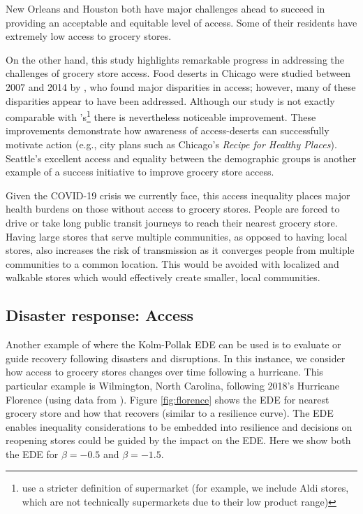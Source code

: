 \documentclass[final,3p,times,onecolumn,sort&compress]{elsarticle}
\begin{document}
New Orleans and Houston both have major challenges ahead to succeed in providing an acceptable and equitable level of access.
Some of their residents have extremely low access to grocery stores.

On the other hand, this study highlights remarkable progress in addressing the challenges of grocery store access.
Food deserts in Chicago were studied between 2007 and 2014 by \cite{Kolak2018-az}, who found major disparities in access; however, many of these disparities appear to have been addressed.
Although our study is not exactly comparable with \cite{Kolak2018-az}'s\footnote{\cite{Kolak2018-az} use a stricter definition of supermarket (for example, we include Aldi stores, which are not technically supermarkets due to their low product range)} there is nevertheless noticeable improvement.
These improvements demonstrate how awareness of access-deserts can successfully motivate action (e.g., city plans such as Chicago's \textit{Recipe for Healthy Places}).
Seattle's excellent access and equality between the demographic groups is another example of a success initiative to improve grocery store access.

Given the COVID-19 crisis we currently face, this access inequality places major health burdens on those without access to grocery stores.
People are forced to drive or take long public transit journeys to reach their nearest grocery store.
Having large stores that serve multiple communities, as opposed to having local stores, also increases the risk of transmission as it converges people from multiple communities to a common location.
This would be avoided with localized and walkable stores which would effectively create smaller, local communities.

\subsection{Disaster response: Access}
Another example of where the Kolm-Pollak EDE can be used is to evaluate or guide recovery following disasters and disruptions.
In this instance, we consider how access to grocery stores changes over time following a hurricane.
This particular example is Wilmington, North Carolina, following 2018's Hurricane Florence (using data from \cite{Logan2020-vj}).
Figure \ref{fig:florence} shows the EDE for nearest grocery store and how that recovers (similar to a resilience curve).
The EDE enables inequality considerations to be embedded into resilience and decisions on reopening stores could be guided by the impact on the EDE.
Here we show both the EDE for $\beta=-0.5$ and $\beta=-1.5$.
\end{document}
